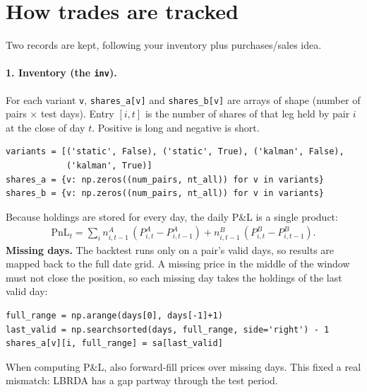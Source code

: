 \documentclass[11pt]{article}
\begin{document}
\section{How trades are tracked}

Two records are kept, following your inventory plus purchases/sales idea.

\paragraph{1. Inventory (the \texttt{inv}).} For each variant \texttt{v},
\texttt{shares\_a[v]} and \texttt{shares\_b[v]} are arrays of shape
(number of pairs $\times$ test days). Entry $[i, t]$ is the number of shares of
that leg held by pair $i$ at the close of day $t$. Positive is long and
negative is short.
\begin{lstlisting}
variants = [('static', False), ('static', True), ('kalman', False),
            ('kalman', True)]
shares_a = {v: np.zeros((num_pairs, nt_all)) for v in variants}
shares_b = {v: np.zeros((num_pairs, nt_all)) for v in variants}
\end{lstlisting}
Because holdings are stored for every day, the daily P\&L is a single product:
\begin{gather*}
    \text{PnL}_t = \sum_i n^A_{i,t-1}\,(P^A_{i,t} - P^A_{i,t-1})
                 + n^B_{i,t-1}\,(P^B_{i,t} - P^B_{i,t-1}).
\end{gather*}
\textbf{Missing days.} The backtest runs only on a pair's valid days, so
results are mapped back to the full date grid. A missing price in the middle
of the window must not close the position, so each missing day takes the
holdings of the last valid day:
\begin{lstlisting}
full_range = np.arange(days[0], days[-1]+1)
last_valid = np.searchsorted(days, full_range, side='right') - 1
shares_a[v][i, full_range] = sa[last_valid]
\end{lstlisting}
When computing P\&L, also forward-fill prices over missing days. This fixed a
real mismatch: LBRDA has a gap partway through the test period.
\end{document}
